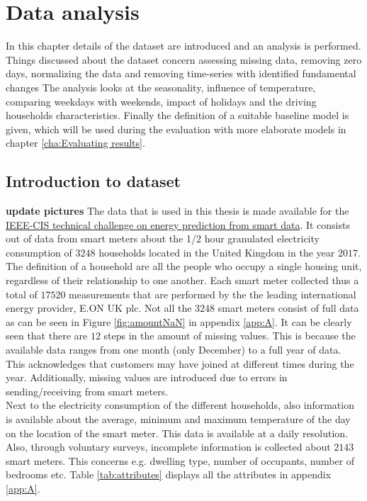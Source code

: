 \chapter{Data analysis}
\label{cha:1}
In this chapter details of the dataset are introduced and an analysis is performed. Things discussed about the dataset concern assessing missing data, removing zero days, normalizing the data and removing time-series with identified fundamental changes The analysis looks at the seasonality,  influence of temperature, comparing weekdays with weekends, impact of holidays and the driving households characteristics. Finally the definition of a suitable baseline model is given, which will be used during the evaluation with more elaborate models in chapter \ref{cha:Evaluating results}.


\section{Introduction to dataset}
\textbf{update pictures}
The data that is used in this thesis is made available for the \href{https://ieee-dataport.org/competitions/ieee-cis-technical-challenge-energy-prediction-smart-meter-data}{IEEE-CIS technical challenge on energy prediction from smart data}. It consists out of data from smart meters about the 1/2 hour granulated electricity consumption of $3248$ households located in the United Kingdom in the year $2017$. The definition of a household are all the people who occupy a single housing unit, regardless of their relationship to one another. Each smart meter collected thus a total of $17520$ measurements that are performed by the the leading international energy provider, E.ON UK plc. Not all the $3248$ smart meters consist of full data as can be seen in Figure \ref{fig:amountNaN} in appendix \ref{app:A}. It can be clearly seen that there are $12$ steps in the amount of missing values. This is because the available data ranges from one month (only December) to a full year of data. This acknowledges that customers may have joined at different times during the year. Additionally, missing values are introduced due to errors in sending/receiving from smart meters.\\
Next to the electricity consumption of the different households, also information is available about the average, minimum and maximum temperature of the day on the location of the smart meter. This data is available at a daily resolution. Also, through voluntary surveys, incomplete information is collected about $2143$ smart meters. This concerns e.g. dwelling type, number of occupants, number of bedrooms etc. Table \ref{tab:attributes} displays all the attributes in appendix \ref{app:A}.\\

